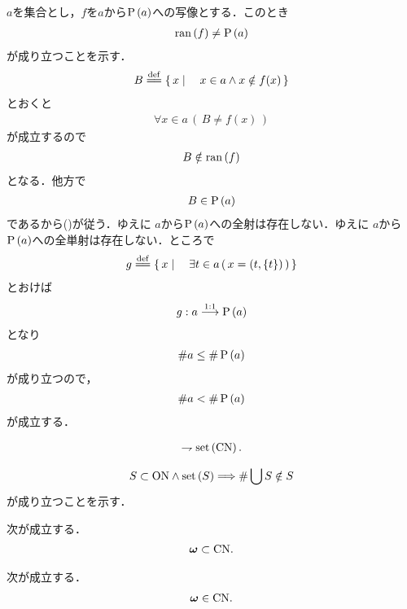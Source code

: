 	\begin{sketch}
		$a$を集合とし，$f$を$a$から$\operatorname*{P} \left(a\right)$への写像とする．このとき
		\begin{align}
			\operatorname*{ran} \left(f\right) \neq \operatorname*{P} \left(a\right)
			\label{eq:Cantor_cardinality_theorem}
		\end{align}
		が成り立つことを示す．
		\begin{align}
			B \defeq \Set{x}{x \in a \wedge x \notin f(x)}
		\end{align}
		とおくと
		\begin{align}
			\forall x \in a\, \left(\, B \neq f(x)\, \right)
		\end{align}
		が成立するので
		\begin{align}
			B \notin \operatorname*{ran} \left(f\right)
		\end{align}
		となる．他方で
		\begin{align}
			B \in \operatorname*{P} \left(a\right)
		\end{align}
		であるから()が従う．ゆえに
		$a$から$\operatorname*{P} \left(a\right)$への全射は存在しない．ゆえに
		$a$から$\operatorname*{P} \left(a\right)$への全単射は存在しない．ところで
		\begin{align}
			g \defeq \Set{x}{\exists t \in a\, (\, x = (t,\{t\})\, )}
		\end{align}
		とおけば
		\begin{align}
			g: a \overset{\mathrm{1:1}}{\longrightarrow} \operatorname*{P} \left(a\right) 
		\end{align}
		となり
		\begin{align}
			\# a \leq \# \operatorname*{P} \left(a\right)
		\end{align}
		が成り立つので，
		\begin{align}
			\# a < \# \operatorname*{P} \left(a\right)
		\end{align}
		が成立する．
		\QED
	\end{sketch}
	
	\begin{screen}
		\begin{thm}[$\CN$は集合でない]
			\begin{align}
				\rightharpoondown \operatorname*{set} \left(\mathrm{CN}\right).
			\end{align}
		\end{thm}
	\end{screen}
	
	\begin{sketch}
		\begin{align}
			S \subset \mathrm{ON} \wedge \operatorname*{set} \left(S\right) \Longrightarrow \# \bigcup S \notin S
		\end{align}
		が成り立つことを示す．
	\end{sketch}
	
	\begin{screen}
		\begin{thm}[自然数は基数]
			次が成立する．
			\begin{align}
				{\boldsymbol \omega} \subset \mathrm{CN}.
			\end{align}
		\end{thm}
	\end{screen}
	
	\begin{screen}
		\begin{thm}[$\Natural$は基数]
			次が成立する．
			\begin{align}
				{\boldsymbol \omega} \in \mathrm{CN}.
			\end{align}
		\end{thm}
	\end{screen}